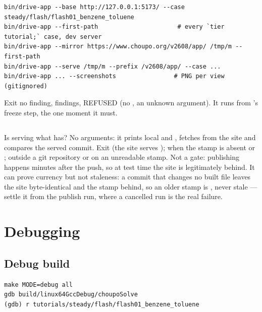 \documentclass[11pt,a4paper]{article}
\begin{document}
\begin{lstlisting}
bin/drive-app --base http://127.0.0.1:5173/ --case steady/flash/flash01_benzene_toluene
bin/drive-app --first-path                      # every `tier tutorial;` case, dev server
bin/drive-app --mirror https://www.choupo.org/v2608/app/ /tmp/m --first-path
bin/drive-app --serve /tmp/m --prefix /v2608/app/ --case ...
bin/drive-app ... --screenshots                # PNG per view (gitignored)
\end{lstlisting}

Exit  no finding,  findings,  REFUSED (no
, an unknown argument).  It runs from 's
freeze step, the one moment it must.

\subsection{}\label{sec:tool-sitepublished}

Is  serving what  has?  No arguments:
it prints local  and , fetches
 from the site and compares the served commit.
Exit   (the site serves );
 when the stamp is absent or ; 
outside a git repository or on an unreadable stamp.  Not a gate:
publishing happens minutes after the push, so at test time the site is
legitimately behind.  It can prove currency but not staleness: a commit
that changes no built file leaves the site byte-identical and the stamp
behind, so an older stamp is , never stale --- settle
it from the publish run, where a cancelled run is the real failure.
\section{Debugging}\label{sec:debug}

\subsection{Debug build}

\begin{lstlisting}
make MODE=debug all
gdb build/linux64GccDebug/choupoSolve
(gdb) r tutorials/steady/flash/flash01_benzene_toluene
\end{lstlisting}
\end{document}
